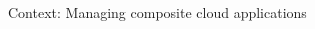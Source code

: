 \documentclass{beamer}
\begin{document}
\begin{frame}[t]{Context: Managing composite cloud applications}
    \vspace*{-2.5em}
    \begin{columns}[b]
      \begin{column}{.3\textwidth}
        \centering
      \end{column}
      \begin{column}{.3\textwidth}


\end{column}
\end{columns}
\end{frame}
\end{document}

